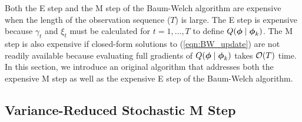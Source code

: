 
Both the E step and the M step of the Baum-Welch algorithm are expensive when the length of the observation sequence ($T$) is large. The E step is expensive because $\gamma_t$ and $\xi_t$ must be calculated for $t = 1,\ldots,T$ to define $Q(\boldsymbol{\phi} \mid \boldsymbol{\phi}_k)$. The M step is also expensive if closed-form solutions to (\ref{eqn:BW_update}) are not readily available because evaluating full gradients of $Q(\boldsymbol{\phi} \mid \boldsymbol{\phi}_{k})$ takes $\mathcal{O}(T)$ time. In this section, we introduce an original algorithm that addresses both the expensive M step as well as the expensive E step of the Baum-Welch algorithm. %

\subsection{Variance-Reduced Stochastic M Step}
\label{subsec:stoch_M}

